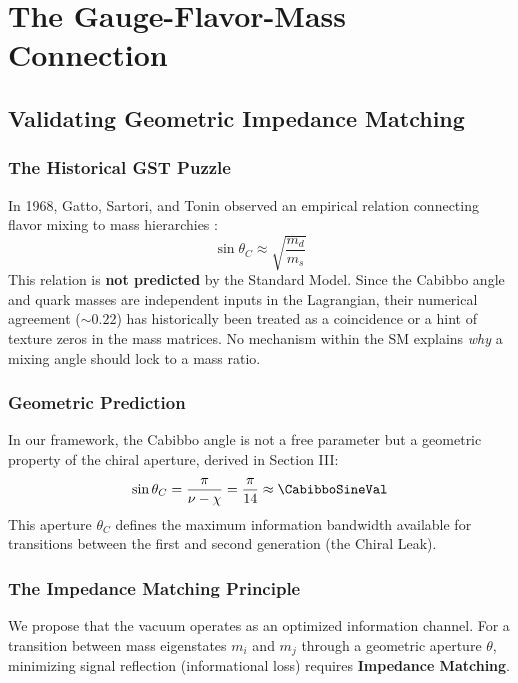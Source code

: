 
\section{The Gauge-Flavor-Mass Connection}

\subsection{Validating Geometric Impedance Matching}

\subsubsection{The Historical GST Puzzle}
In 1968, Gatto, Sartori, and Tonin observed an empirical relation connecting flavor mixing to mass hierarchies \cite{gatto_weak_1968}:
\begin{equation}
    \sin \theta_C \approx \sqrt{\frac{m_d}{m_s}}
    \label{eq:gst_empirical}
\end{equation}
This relation is \textbf{not predicted} by the Standard Model. Since the Cabibbo angle and quark masses are independent inputs in the Lagrangian, their numerical agreement ($\sim 0.22$) has historically been treated as a coincidence or a hint of texture zeros in the mass matrices. No mechanism within the SM explains \textit{why} a mixing angle should lock to a mass ratio.

\subsubsection{Geometric Prediction}
In our framework, the Cabibbo angle is not a free parameter but a geometric property of the chiral aperture, derived in Section III:
\begin{equation}
    \sin \theta_C = \frac{\pi}{\nu - \chi} = \frac{\pi}{14} \approx \CabibboSineVal
\end{equation}
This aperture $\theta_C$ defines the maximum information bandwidth available for transitions between the first and second generation (the Chiral Leak).

\subsubsection{The Impedance Matching Principle}
We propose that the vacuum operates as an optimized information channel. For a transition between mass eigenstates $m_i$ and $m_j$ through a geometric aperture $\theta$, minimizing signal reflection (informational loss) requires \textbf{Impedance Matching}.

